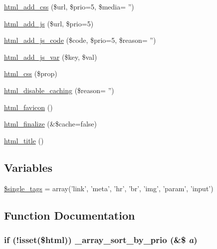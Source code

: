 \begin{CompactItemize}
\item 
\hyperlink{html_8inc_8php_962ef1b29e909a38b9a7b79086d54ab2}{html\_\-add\_\-css} (\$url, \$prio=5, \$media= '')
\item 
\hyperlink{html_8inc_8php_450214704e1bbc2e8849abb54db38a03}{html\_\-add\_\-js} (\$url, \$prio=5)
\item 
\hyperlink{html_8inc_8php_90601d141e5751c07b61f32f623ed7d2}{html\_\-add\_\-js\_\-code} (\$code, \$prio=5, \$reason= '')
\item 
\hyperlink{html_8inc_8php_84769b7fe7b5454ff46534d0577eb54c}{html\_\-add\_\-js\_\-var} (\$key, \$val)
\item 
\hyperlink{html_8inc_8php_d52276fa2a03df7342ba4b8e6a334ce0}{html\_\-css} (\$prop)
\item 
\hyperlink{html_8inc_8php_b0dafe79ee61164014b0a4d8b4112dbb}{html\_\-disable\_\-caching} (\$reason= '')
\item 
\hyperlink{html_8inc_8php_5738adf9b56d1ff2b8d02977ed7929ce}{html\_\-favicon} ()
\item 
\hyperlink{html_8inc_8php_405dc7e3718d4196c05087057ebf69bf}{html\_\-finalize} (\&\$cache=false)
\item 
\hyperlink{html_8inc_8php_3f572f51a815fe19c590fea7d6d3a1a6}{html\_\-title} ()
\end{CompactItemize}
\subsection*{Variables}
\begin{CompactItemize}
\item 
\hyperlink{html_8inc_8php_0a733c7a281726a879f13e7325881887}{\$single\_\-tags} = array('link', 'meta', 'hr', 'br', 'img', 'param', 'input')
\end{CompactItemize}


\subsection{Function Documentation}
\hypertarget{html_8inc_8php_7fb2b386b2bae219112628971275c225}{
\subsubsection[{\_\-array\_\-sort\_\-by\_\-prio}]{\setlength{\rightskip}{0pt plus 5cm}if (!isset(\$html)) \_\-array\_\-sort\_\-by\_\-prio (\&\$ {\em a})}}
\label{html_8inc_8php_7fb2b386b2bae219112628971275c225}


